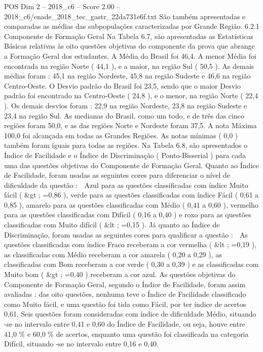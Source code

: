 \begin{textsample}{POS Dim 2 – 2018\_c6 – Score 2.00 – 2018\_c6/enade\_2018\_tec\_gastr\_22da731e6f.txt}
São também apresentadas e comparadas as médias das subpopulações caracterizadas por Grande Região. 6.2.1 Componente de Formação Geral Na Tabela 6.7, são apresentadas as Estatísticas Básicas relativas às oito questões objetivas do componente da prova que abrange a Formação Geral dos estudantes.
A Média do Brasil foi 46,4.
A menor Média foi encontrada na região Norte ( 44,1 ), e a maior, na região Sul ( 50,5 ).
As demais médias foram : 45,1 na região Nordeste, 45,8 na região Sudeste e 46,6 na região Centro-Oeste.
O Desvio padrão do Brasil foi 23,5, sendo que o maior Desvio padrão foi encontrado na Centro-Oeste ( 24,8 ), e o menor, na região Norte ( 22,4 ).
Os demais desvios foram : 22,9 na região Nordeste, 23,8 na região Sudeste e 23,4 na região Sul.
As medianas do Brasil, como um todo, e de três das cinco regiões foram 50,0, e as das regiões Norte e Nordeste foram 37,5.
A nota Máxima 100,0 foi alcançada em todas as Grandes Regiões.
As notas mínimas ( 0,0 ) também foram iguais para todas as regiões.
Na Tabela 6.8, são apresentados o Índice de Facilidade e o Índice de Discriminação ( Ponto-Bisserial ) para cada uma das questões objetivas do Componente de Formação Geral.
Quanto ao Índice de Facilidade, foram usadas as seguintes cores para diferenciar o nível de dificuldade da questão :  Azul para as questões classificadas com índice Muito fácil ( \&gt ; =0,86 ), verde para as questões classificadas com índice Fácil ( 0,61 a 0,85 ), amarelo para as questões classificadas com Médio ( 0,41 a 0,60 ), vermelho para as questões classificadas com Difícil ( 0,16 a 0,40 ) e roxo para as questões classificadas com Muito difícil ( \&lt ; =0,15 ).
Já quanto ao Índice de Discriminação, foram usadas as seguintes cores para qualificar a questão :  As questões classificadas com índice Fraco receberam a cor vermelha ( \&lt ; =0,19 ), as classificadas com Médio receberam a cor amarela ( 0,20 a 0,29 ), as classificadas com Bom receberam a cor verde ( 0,30 a 0,39 ) e as classificadas com Muito bom ( \&gt ; =0,40 ) receberam a cor azul.
As questões objetivas do Componente de Formação Geral, segundo o Índice de Facilidade, foram assim avaliadas : das oito questões, nenhuma teve o Índice de Facilidade classificado como Muito fácil, e uma questão foi tida como Fácil, por ter índice de acertos 0,61.
Seis questões foram consideradas com índice de dificuldade Médio, situando -se no intervalo entre 0,41 e 0,60 do Índice de Facilidade, ou seja, houve entre 41,0 \% e 60,0 \% de acertos, enquanto uma questão foi classificada na categoria Difícil, situando -se no intervalo entre 0,16 e 0,40.

\end{textsample}
